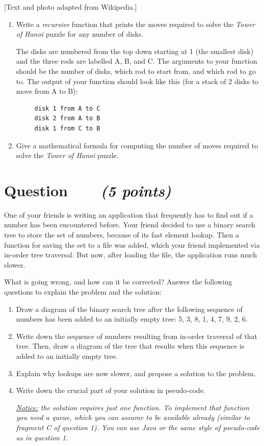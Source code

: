 \documentclass[a4paper]{article}
\newcounter{question}
\newcommand{\question}[1]{\refstepcounter{question}\section*{Question~\thequestion~~~\small\emph{(#1)}}}
\renewcommand*\thequestion{\arabic{question}}
\begin{document}
\footnotesize
\hfill
[Text and photo adapted from Wikipedia.]
\normalsize

\begin{enumerate}
\item
  Write a \emph{recursive} function that prints the moves required to solve the \emph{Tower of Hanoi} puzzle for any number of disks.
  
  The disks are numbered from the top down starting at 1 (the smallest disk) and the three rods are labelled A, B, and C.
  The arguments to your function should be the number of disks, which rod to start from, and which rod to go to.
  The output of your function should look like this (for a stack of 2 disks to move from A to B):
\begin{verbatim}
     disk 1 from A to C
     disk 2 from A to B
     disk 1 from C to B
\end{verbatim}

\item
  Give a mathematical formula for computing the number of moves required to solve the \emph{Tower of Hanoi} puzzle.
  
\end{enumerate}


\clearpage

\question{5 points}

One of your friends is writing an application that frequently has to find out if a number has been encountered before.
Your friend decided to use a binary search tree to store the set of numbers, because of its fast element lookup.
Then a function for saving the set to a file was added, which your friend implemented via in-order tree traversal.
But now, after loading the file, the application runs much slower.

What is going wrong, and how can it be corrected?
Answer the following questions to explain the problem and the solution:
\begin{enumerate}
\item
  Draw a diagram of the binary search tree after the following sequence of numbers has been added to an initially empty tree: 5, 3, 8, 1, 4, 7, 9, 2, 6.
\item
  Write down the sequence of numbers resulting from in-order traversal of that tree.
  Then, draw a diagram of the tree that results when this sequence is added to an initially empty tree.
\item
  Explain why lookups are now slower, and propose a solution to the problem.
\item
  Write down the crucial part of your solution in pseudo-code.
  
  \emph{\underline{Notice:} the solution requires just one function.
    To implement that function you need a queue, which you can assume to be available already (similar to fragment C of question 1).
    You can use Java or the same style of pseudo-code as in question 1.}
\end{enumerate}
\end{document}
